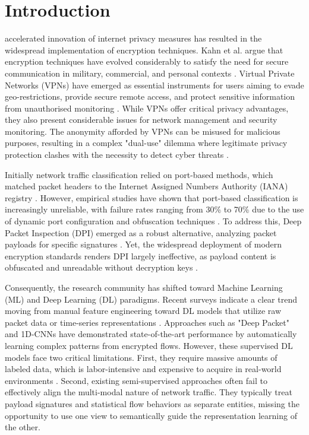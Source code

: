 \section{Introduction}
 accelerated innovation of internet privacy measures has resulted in the widespread implementation of encryption techniques. Kahn et al. argue that encryption techniques have evolved considerably to satisfy the need for secure communication in military, commercial, and personal contexts \cite{kahn1996codebreakers}. Virtual Private Networks (VPNs) have emerged as essential instruments for users aiming to evade geo-restrictions, provide secure remote access, and protect sensitive information from unauthorised monitoring \cite{singhpall1996vpn}. While VPNs offer critical privacy advantages, they also present considerable issues for network management and security monitoring. The anonymity afforded by VPNs can be misused for malicious purposes, resulting in a complex "dual-use" dilemma where legitimate privacy protection clashes with the necessity to detect cyber threats \cite{dipietro2021new}.

Initially network traffic classification relied on port-based methods, which matched packet headers to the Internet Assigned Numbers Authority (IANA) registry \cite{yoon2009internet}. However, empirical studies have shown that port-based classification is increasingly unreliable, with failure rates ranging from 30\% to 70\% due to the use of dynamic port configuration and obfuscation techniques \cite{moore2005toward}. To address this, Deep Packet Inspection (DPI) emerged as a robust alternative, analyzing packet payloads for specific signatures \cite{finsterbusch2013survey}. Yet, the widespread deployment of modern encryption standards renders DPI largely ineffective, as payload content is obfuscated and unreadable without decryption keys \cite{wang2017endtoend}.

Consequently, the research community has shifted toward Machine Learning (ML) and Deep Learning (DL) paradigms. Recent surveys indicate a clear trend moving from manual feature engineering toward DL models that utilize raw packet data or time-series representations \cite{razooqi2025vpn}. Approaches such as "Deep Packet" \cite{lotfollahi2019deep} and 1D-CNNs \cite{wang2017endtoend} have demonstrated state-of-the-art performance by automatically learning complex patterns from encrypted flows. However, these supervised DL models face two critical limitations. First, they require massive amounts of labeled data, which is labor-intensive and expensive to acquire in real-world environments \cite{menezes2018handbook}. Second, existing semi-supervised approaches \cite{lin2022semisupervised} often fail to effectively align the multi-modal nature of network traffic. They typically treat payload signatures and statistical flow behaviors as separate entities, missing the opportunity to use one view to semantically guide the representation learning of the other.

